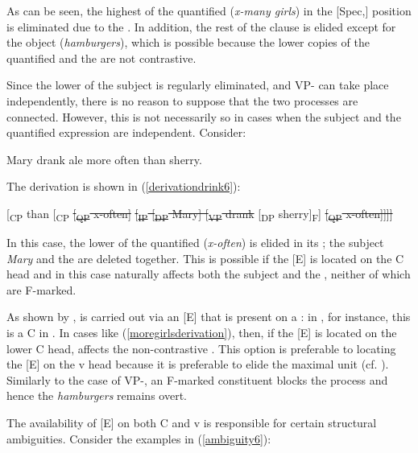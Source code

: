 As can be seen, the highest  of the quantified  (\textit{x-many girls}) in the [Spec,] position is eliminated due to the . In addition, the rest of the clause is elided except for the object  (\textit{hamburgers}), which is possible because the lower copies of the quantified  and the  are not contrastive.

Since the lower  of the subject  is regularly eliminated, and VP- can take place independently, there is no reason to suppose that the two processes are connected. However, this is not necessarily so in cases when the subject and the quantified expression are independent. Consider:

\ea	Mary drank ale more often than sherry.
\z

The derivation is shown in (\ref{derivationdrink6}):

\ea	{}[\textsubscript{CP} than [\textsubscript{CP} \sout{[\textsubscript{QP} x-often]} \sout{[\textsubscript{IP} [\textsubscript{DP} Mary] [\textsubscript{VP} drank} [\textsubscript{DP} sherry]\textsubscript{F}] \sout{[\textsubscript{QP} x-often]]]]} \label{derivationdrink6}
\z

In this case, the lower  of the quantified  (\textit{x-often}) is elided in its ; the subject  \textit{Mary} and the  are deleted together. This is possible if the [E]  is located on the C head and  in this case naturally affects both the subject and the , neither of which are F-marked.

As shown by \citet{merchant2001},  is carried out via an [E]  that is present on a : in , for instance, this  is a C in . In cases like (\ref{moregirlsderivation}), then, if the [E]  is located on the lower C head,  affects the non-contrastive . This option is preferable to locating the [E]  on the v head because it is preferable to elide the maximal unit (cf. \citealt{merchant2008}). Similarly to the case of VP-, an F-marked constituent blocks the  process and hence the  \textit{hamburgers} remains overt.

The availability of [E] on both C and v is responsible for certain structural ambiguities. Consider the examples in (\ref{ambiguity6}):

